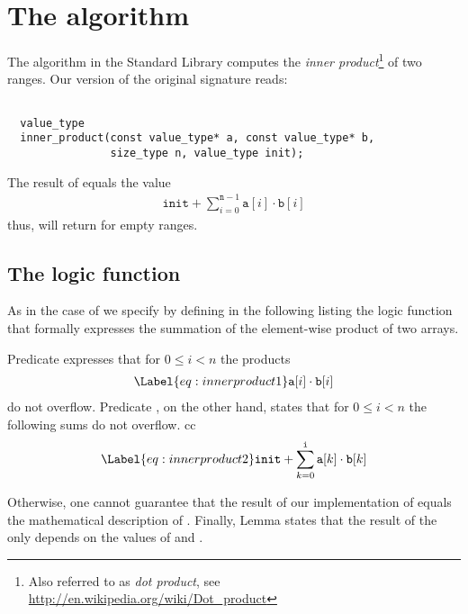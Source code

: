 
\section{The \innerproduct algorithm}

The \innerproduct algorithm in the \cxx Standard Library \cite[\S 29.8.4]{cxx-17-draft} computes
the \emph{inner product}\footnote{
  Also referred to as \emph{dot product}, see \url{http://en.wikipedia.org/wiki/Dot_product}
}
of two ranges.
%
Our version of the original signature
reads:

\begin{lstlisting}[style=acsl-block]

  value_type
  inner_product(const value_type* a, const value_type* b,
                size_type n, value_type init);
\end{lstlisting} 

The result of \innerproduct equals the value
\begin{gather*}
\mathtt{init} + \sum_{i = 0}^{\mathtt{n}-1} \mathtt{a}[i] \cdot \mathtt{b}[i]
\end{gather*}
thus, \innerproduct will return  for empty ranges.


\subsection{The logic function \InnerProduct}

As in the case of  we specify \innerproduct
by defining in the following listing the logic function \InnerProduct
that formally expresses the summation of the element-wise product of two arrays.

Predicate  expresses that for $0 \leq i < n$ the products 
%
\begin{align}
\Label{eq:innerproduct1}
\mathtt{a}[i] \cdot \mathtt{b}[i] 
\end{align}
%
do not overflow. 
Predicate , on the other hand, states that for $0 \leq i < n$
the following sums do not overflow.
cc%
\begin{align}
\Label{eq:innerproduct2}
\mathtt{init} + \sum_{k = 0}^{\mathtt{i}} \mathtt{a}[k] \cdot \mathtt{b}[k]
\end{align}

Otherwise, one cannot guarantee that the result of our implementation
of  equals the mathematical description of \InnerProduct.
Finally, Lemma  states that the result of the \InnerProduct only
depends on the values of  and .


